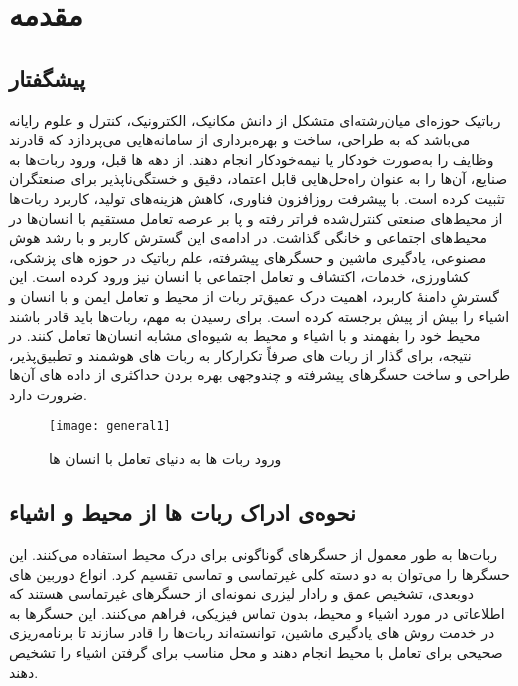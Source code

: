 
\chapter{مقدمه}
\section{پیشگفتار}
رباتیک حوزه‌ای میان‌رشته‌ای متشکل از دانش مکانیک، الکترونیک، کنترل و علوم رایانه می‌باشد که به طراحی، ساخت و بهره‌برداری از سامانه‌هایی می‌پردازد که قادرند وظایف را به‌صورت خودکار یا نیمه‌خودکار انجام دهند.
\cite{wallen2008history}
 از دهه ها قبل، ورود ربات‌ها به صنایع، آن‌ها را به عنوان راه‌حل‌هایی قابل اعتماد، دقیق و خستگی‌ناپذیر برای صنعتگران تثبیت کرده است. با پیشرفت روزافزون فناوری، کاهش هزینه‌های تولید، کاربرد ربات‌ها از محیط‌های صنعتی کنترل‌شده فراتر رفته و پا بر عرصه‌ تعامل مستقیم با انسان‌ها در محیط‌های اجتماعی و خانگی گذاشت. 
 \cite{broadbent2017interactions,dahiya2013robotic}
 در ادامه‌ی این گسترش کاربر و با رشد هوش مصنوعی، یادگیری ماشین و حسگرهای پیشرفته، علم رباتیک در حوزه های پزشکی، کشاورزی، خدمات، اکتشاف و تعامل اجتماعی با انسان نیز ورود کرده است.
 \cite{wang2024multimodal,sheridan2016human}
  این گسترشِ دامنهٔ کاربرد، اهمیت درک عمیق‌تر ربات از محیط و تعامل ایمن و با انسان و اشیاء را بیش از پیش برجسته کرده است. برای رسیدن به مهم، ربات‌ها باید قادر باشند محیط خود را بفهمند و با اشیاء و محیط به شیوه‌ای مشابه انسان‌ها تعامل کنند. در نتیجه، برای گذار از ربات های صرفاً تکرارکار به ربات ‌های هوشمند و تطبیق‌پذیر، طراحی و ساخت حسگرهای پیشرفته و چندوجهی
  بهره بردن حداکثری از داده های آن‌ها ضرورت دارد.
  \cite{wang2024multimodal}
  \\
 \begin{figure}[ht]
 	\centerline{\texttt{[image: general1]}}
 	\caption{ورود ربات ها به دنیای تعامل با انسان ها
 	}
 	\label{fig:general1}
 \end{figure}


\section{نحوه‌ی ادراک  ربات ها از محیط و اشیاء}
ربات‌ها به طور معمول از حسگرهای گوناگونی برای درک محیط استفاده می‌کنند. این حسگرها را می‌توان به دو دسته  کلی غیرتماسی و تماسی تقسیم کرد. انواع دوربین های دوبعدی، تشخیص عمق و رادار لیزری
نمونه‌ای از حسگرهای غیرتماسی هستند که اطلاعاتی در مورد اشیاء و محیط، بدون تماس فیزیکی، فراهم می‌کنند. این حسگرها به در خدمت روش های یادگیری ماشین، توانسته‌اند ربات‌ها را قادر سازند تا برنامه‌ریزی صحیحی برای تعامل با محیط انجام دهند و محل مناسب برای گرفتن اشیاء را تشخیص دهند.
\cite{tian2023data,hosseini2024multi,beigy2024explorable,sabzejou20232d,moghadam2023grasp}
